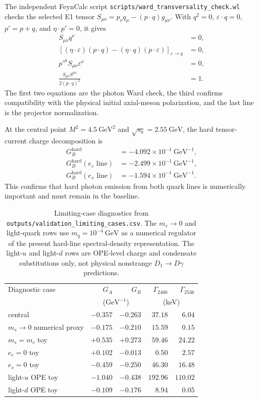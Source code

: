 \documentclass[11pt]{article}
\newcommand{\GeV}{\mathrm{GeV}}
\begin{document}
The independent FeynCalc script
\texttt{scripts/ward\_transversality\_check.wl} checks the selected E1 tensor
$S_{\mu\nu}=p_\nu q_\mu-(p\cdot q)g_{\mu\nu}$.  With
$q^2=0$, $\varepsilon\cdot q=0$, $p'=p+q$, and $\eta\cdot p'=0$, it gives
\begin{align}
  S_{\mu\nu}q^\nu &=0,\\
  \left[(\eta\cdot\varepsilon)(p\cdot q)
    -(\eta\cdot q)(p\cdot\varepsilon)\right]_{\varepsilon\to q}
  &=0,\\
  p'^\mu S_{\mu\nu}\varepsilon^\nu&=0,\\
  \frac{S_{\mu\nu}S^{\mu\nu}}{2(p\cdot q)^2}&=1.
\end{align}
The first two equations are the photon Ward check, the third confirms
compatibility with the physical initial axial-meson polarization, and the last
line is the projector normalization.

At the central point $M^2=4.5~\GeV^2$ and
$\sqrt{s_0}=2.55~\GeV$, the hard tensor-current charge decomposition is
\begin{align}
  G_B^{\mathrm{hard}}&=-4.092\times10^{-1}~\GeV^{-1},\\
  G_B^{\mathrm{hard}}(e_c\text{ line})&=-2.499\times10^{-1}~\GeV^{-1},\\
  G_B^{\mathrm{hard}}(e_s\text{ line})&=-1.594\times10^{-1}~\GeV^{-1}.
\end{align}
This confirms that hard photon emission from both quark lines is numerically
important and must remain in the baseline.

\begin{table}[htbp]
  \centering
  \begin{tabular}{lrrrr}
    \toprule
    Diagnostic case & $G_A$ & $G_B$ & $\Gamma_{2460}$ & $\Gamma_{2536}$\\
    & \multicolumn{2}{c}{($\GeV^{-1}$)} & \multicolumn{2}{c}{(keV)}\\
    \midrule
    central & $-0.357$ & $-0.263$ & $37.18$ & $6.04$\\
    $m_s\to0$ numerical proxy & $-0.175$ & $-0.210$ & $15.59$ & $0.15$\\
    $m_s=m_c$ toy & $+0.535$ & $+0.273$ & $59.46$ & $24.22$\\
    $e_c=0$ toy & $+0.102$ & $-0.013$ & $0.50$ & $2.57$\\
    $e_s=0$ toy & $-0.459$ & $-0.250$ & $46.30$ & $16.48$\\
    light-$u$ OPE toy & $-1.040$ & $-0.438$ & $192.96$ & $110.02$\\
    light-$d$ OPE toy & $-0.109$ & $-0.176$ & $8.94$ & $0.05$\\
    \bottomrule
  \end{tabular}
  \caption{Limiting-case diagnostics from
  \texttt{outputs/validation\_limiting\_cases.csv}.  The $m_s\to0$ and
  light-quark rows use $m_q=10^{-4}~\GeV$ as a numerical regulator of the
  present hard-line spectral-density representation.  The light-$u$ and
  light-$d$ rows are OPE-level charge and condensate substitutions only, not
  physical nonstrange $D_1\to D\gamma$ predictions.}
  \label{tab:validation-limits}
\end{table}
\end{document}
